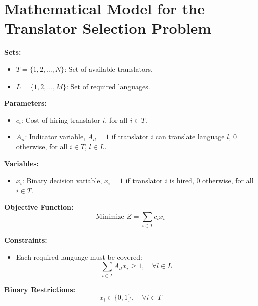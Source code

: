 \documentclass{article}
\begin{document}
\section*{Mathematical Model for the Translator Selection Problem}

\textbf{Sets:}
\begin{itemize}
    \item $T = \{1, 2, \ldots, N\}$: Set of available translators.
    \item $L = \{1, 2, \ldots, M\}$: Set of required languages.
\end{itemize}

\textbf{Parameters:}
\begin{itemize}
    \item $c_i$: Cost of hiring translator $i$, for all $i \in T$.
    \item $A_{il}$: Indicator variable, $A_{il} = 1$ if translator $i$ can translate language $l$, $0$ otherwise, for all $i \in T$, $l \in L$.
\end{itemize}

\textbf{Variables:}
\begin{itemize}
    \item $x_i$: Binary decision variable, $x_i = 1$ if translator $i$ is hired, $0$ otherwise, for all $i \in T$.
\end{itemize}

\textbf{Objective Function:}
\begin{equation}
\text{Minimize } Z = \sum_{i \in T} c_i x_i
\end{equation}

\textbf{Constraints:}
\begin{itemize}
    \item Each required language must be covered:
    \begin{equation}
    \sum_{i \in T} A_{il} x_i \geq 1, \quad \forall l \in L
    \end{equation}
\end{itemize}

\textbf{Binary Restrictions:}
\begin{equation}
x_i \in \{0, 1\}, \quad \forall i \in T
\end{equation}
\end{document}
